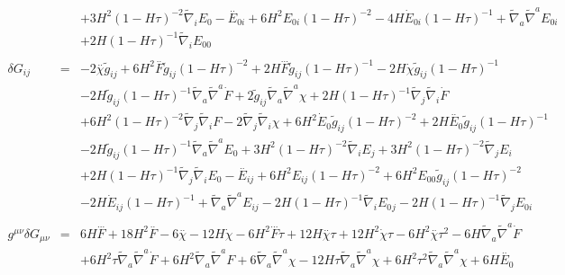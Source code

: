 \documentclass[10pt,letterpaper]{article}
\numberwithin{equation}{section}
\begin{document}
\begin{eqnarray}
&& + 3 H^2 (1 -  H \tau)^{-2} \tilde{\nabla}_{i}E_{0}{}- \overset{..}{E}_{0i}{} + 6 H^2 E_{0i}{} (1 -  H \tau)^{-2} - 4 H \dot{E}_{0i}{} (1 -  H \tau)^{-1} + \tilde{\nabla}_{a}\tilde{\nabla}^{a}E_{0i}{} \nonumber \\ 
&& + 2 H (1 -  H \tau)^{-1} \tilde{\nabla}_{i}E_{00}{}
\\  \nonumber\\ 
\delta G_{ij}&=& -2 \overset{..}{\chi} \tilde{g}_{ij} + 6 H^2 \overset{..}{F} \tilde{g}_{ij} (1 -  H \tau)^{-2} + 2 H \overset{...}{F} \tilde{g}_{ij} (1 -  H \tau)^{-1} - 2 H \dot{\chi} \tilde{g}_{ij} (1 -  H \tau)^{-1} \nonumber \\ 
&& - 2 H \tilde{g}_{ij} (1 -  H \tau)^{-1} \tilde{\nabla}_{a}\tilde{\nabla}^{a}\dot{F} + 2 \tilde{g}_{ij} \tilde{\nabla}_{a}\tilde{\nabla}^{a}\chi + 2 H (1 -  H \tau)^{-1} \tilde{\nabla}_{j}\tilde{\nabla}_{i}\dot{F} \nonumber \\ 
&& + 6 H^2 (1 -  H \tau)^{-2} \tilde{\nabla}_{j}\tilde{\nabla}_{i}F - 2 \tilde{\nabla}_{j}\tilde{\nabla}_{i}\chi +6 H^2 \dot{E}_{0}{} \tilde{g}_{ij} (1 -  H \tau)^{-2} + 2 H \overset{..}{E}_{0}{} \tilde{g}_{ij} (1 -  H \tau)^{-1} \nonumber \\ 
&& - 2 H \tilde{g}_{ij} (1 -  H \tau)^{-1} \tilde{\nabla}_{a}\tilde{\nabla}^{a}E_{0}{} + 3 H^2 (1 -  H \tau)^{-2} \tilde{\nabla}_{i}E_{j} + 3 H^2 (1 -  H \tau)^{-2} \tilde{\nabla}_{j}E_{i} \nonumber \\ 
&& + 2 H (1 -  H \tau)^{-1} \tilde{\nabla}_{j}\tilde{\nabla}_{i}E_{0}{}- \overset{..}{E}_{ij} + 6 H^2 E_{ij} (1 -  H \tau)^{-2} + 6 H^2 E_{00}{} \tilde{g}_{ij} (1 -  H \tau)^{-2} \nonumber \\ 
&& - 2 H \dot{E}_{ij} (1 -  H \tau)^{-1} + \tilde{\nabla}_{a}\tilde{\nabla}^{a}E_{ij} - 2 H (1 -  H \tau)^{-1} \tilde{\nabla}_{i}E_{0}{}_{j} - 2 H (1 -  H \tau)^{-1} \tilde{\nabla}_{j}E_{0i}{}
\\ \nonumber\\
g^{\mu\nu}\delta G_{\mu\nu}  &=&  6 H \overset{...}{F} + 18 H^2 \overset{..}{F} - 6 \overset{..}{\chi} - 12 H \dot{\chi} - 6 H^2 \overset{...}{F} \tau + 12 H \overset{..}{\chi} \tau + 12 H^2 \dot{\chi} \tau - 6 H^2 \overset{..}{\chi} \tau^2 - 6 H \tilde{\nabla}_{a}\tilde{\nabla}^{a}\dot{F} \nonumber \\ 
&& + 6 H^2 \tau \tilde{\nabla}_{a}\tilde{\nabla}^{a}\dot{F} + 6 H^2 \tilde{\nabla}_{a}\tilde{\nabla}^{a}F + 6 \tilde{\nabla}_{a}\tilde{\nabla}^{a}\chi - 12 H \tau \tilde{\nabla}_{a}\tilde{\nabla}^{a}\chi + 6 H^2 \tau^2 \tilde{\nabla}_{a}\tilde{\nabla}^{a}\chi +6 H \overset{..}{E}_{0}{} \nonumber \\ 

\end{eqnarray}
\end{document}
